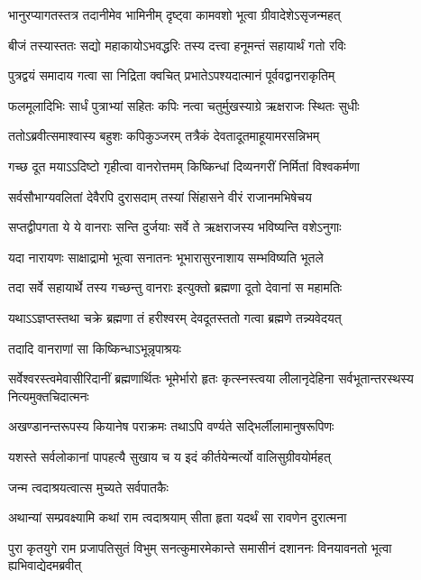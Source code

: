 \twolineshloka
{भानुरप्यागतस्तत्र तदानीमेव भामिनीम्}
{दृष्ट्वा कामवशो भूत्वा ग्रीवादेशेऽसृजन्महत्} %

\twolineshloka
{बीजं तस्यास्ततः सद्यो महाकायोऽभवद्धरिः}
{तस्य दत्त्वा हनूमन्तं सहायार्थं गतो रविः} %

\twolineshloka
{पुत्रद्वयं समादाय गत्वा सा निद्रिता क्वचित्}
{प्रभातेऽपश्यदात्मानं पूर्ववद्वानराकृतिम्} %

\twolineshloka
{फलमूलादिभिः सार्धं पुत्राभ्यां सहितः कपिः}
{नत्वा चतुर्मुखस्याग्रे ऋक्षराजः स्थितः सुधीः} %

\twolineshloka
{ततोऽब्रवीत्समाश्वास्य बहुशः कपिकुञ्जरम्}
{तत्रैकं देवतादूतमाहूयामरसन्निभम्} %

\twolineshloka
{गच्छ दूत मयाऽऽदिष्टो गृहीत्वा वानरोत्तमम्}
{किष्किन्धां दिव्यनगरीं निर्मितां विश्वकर्मणा} %

\twolineshloka
{सर्वसौभाग्यवलितां देवैरपि दुरासदाम्}
{तस्यां सिंहासने वीरं राजानमभिषेचय} %

\twolineshloka
{सप्तद्वीपगता ये ये वानराः सन्ति दुर्जयाः}
{सर्वे ते ऋक्षराजस्य भविष्यन्ति वशेऽनुगाः} %

\twolineshloka
{यदा नारायणः साक्षाद्रामो भूत्वा सनातनः}
{भूभारासुरनाशाय सम्भविष्यति भूतले} %

\twolineshloka
{तदा सर्वे सहायार्थे तस्य गच्छन्तु वानराः}
{इत्युक्तो ब्रह्मणा दूतो देवानां स महामतिः} %

\twolineshloka
{यथाऽऽज्ञप्तस्तथा चक्रे ब्रह्मणा तं हरीश्वरम्}
{देवदूतस्ततो गत्वा ब्रह्मणे तन्न्यवेदयत्} %

\onelineshloka
{तदादि वानराणां सा किष्किन्धाऽभून्नृपाश्रयः} %

\threelineshloka
{सर्वेश्वरस्त्वमेवासीरिदानीं ब्रह्मणार्थितः}
{भूमेर्भारो हृतः कृत्स्नस्त्वया लीलानृदेहिना}
{सर्वभूतान्तरस्थस्य नित्यमुक्तचिदात्मनः} %

\twolineshloka
{अखण्डानन्तरूपस्य कियानेष पराक्रमः}
{तथाऽपि वर्ण्यते सद्भिर्लीलामानुषरूपिणः} %

\twolineshloka
{यशस्ते सर्वलोकानां पापहत्यै सुखाय च}
{य इदं कीर्तयेन्मर्त्यो वालिसुग्रीवयोर्महत्} %

\onelineshloka
{जन्म त्वदाश्रयत्वात्स मुच्यते सर्वपातकैः} %

\twolineshloka
{अथान्यां सम्प्रवक्ष्यामि कथां राम त्वदाश्रयाम्}
{सीता हृता यदर्थं सा रावणेन दुरात्मना} %

\threelineshloka
{पुरा कृतयुगे राम प्रजापतिसुतं विभुम्}
{सनत्कुमारमेकान्ते समासीनं दशाननः}
{विनयावनतो भूत्वा ह्यभिवाद्येदमब्रवीत्} %

